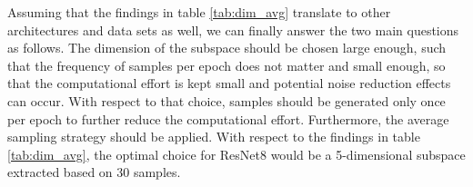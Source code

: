 \documentclass[11pt, a4paper]{article}
\begin{document}

Assuming that the findings in table \ref{tab:dim_avg} translate to other architectures and data sets as well, we can finally answer the two main questions as follows. The dimension of the subspace should be chosen large enough, such that the frequency of samples per epoch does not matter and small enough, so that the computational effort is kept small and potential noise reduction effects can occur. With respect to that choice, samples should be generated only once per epoch to further reduce the computational effort. Furthermore, the average sampling strategy should be applied. With respect to the findings in table \ref{tab:dim_avg}, the optimal choice for ResNet8 would be a 5-dimensional subspace extracted based on 30 samples. \\
\end{document}
